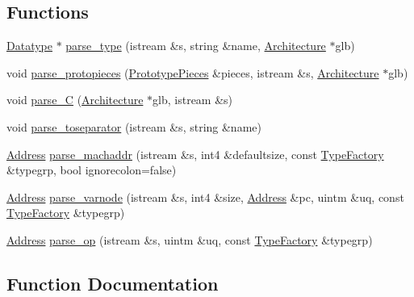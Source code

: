 \subsection*{Functions}
\begin{DoxyCompactItemize}
\item 
\mbox{\hyperlink{class_datatype}{Datatype}} $\ast$ \mbox{\hyperlink{grammar_8hh_aa7c562a7402251d5c2145074da280ae1}{parse\+\_\+type}} (istream \&s, string \&name, \mbox{\hyperlink{class_architecture}{Architecture}} $\ast$glb)
\item 
void \mbox{\hyperlink{grammar_8hh_a0b78f8e3b11c096eee3367e9f7a783c1}{parse\+\_\+protopieces}} (\mbox{\hyperlink{struct_prototype_pieces}{Prototype\+Pieces}} \&pieces, istream \&s, \mbox{\hyperlink{class_architecture}{Architecture}} $\ast$glb)
\item 
void \mbox{\hyperlink{grammar_8hh_a63f1cc59afe6bb193a8e271075524d7f}{parse\+\_\+C}} (\mbox{\hyperlink{class_architecture}{Architecture}} $\ast$glb, istream \&s)
\item 
void \mbox{\hyperlink{grammar_8hh_a555c48bf02e16474c1cf15e761ea7562}{parse\+\_\+toseparator}} (istream \&s, string \&name)
\item 
\mbox{\hyperlink{class_address}{Address}} \mbox{\hyperlink{grammar_8hh_a302ab5f0360041b5ca095c6da01fc5ea}{parse\+\_\+machaddr}} (istream \&s, int4 \&defaultsize, const \mbox{\hyperlink{class_type_factory}{Type\+Factory}} \&typegrp, bool ignorecolon=false)
\item 
\mbox{\hyperlink{class_address}{Address}} \mbox{\hyperlink{grammar_8hh_a058251f048324838196c4589a82738ee}{parse\+\_\+varnode}} (istream \&s, int4 \&size, \mbox{\hyperlink{class_address}{Address}} \&pc, uintm \&uq, const \mbox{\hyperlink{class_type_factory}{Type\+Factory}} \&typegrp)
\item 
\mbox{\hyperlink{class_address}{Address}} \mbox{\hyperlink{grammar_8hh_aeb19e7a1e824350698ccfd193cfb515a}{parse\+\_\+op}} (istream \&s, uintm \&uq, const \mbox{\hyperlink{class_type_factory}{Type\+Factory}} \&typegrp)
\end{DoxyCompactItemize}


\subsection{Function Documentation}
\mbox{\label{grammar_8hh_a63f1cc59afe6bb193a8e271075524d7f}} 
